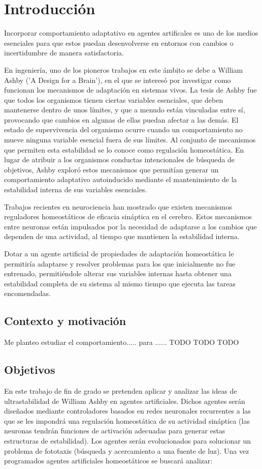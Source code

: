 \chapter{Introducción}
Incorporar comportamiento adaptativo en agentes artificales es uno de los medios esenciales para que estos puedan desenvolverse en entornos con cambios o incertidumbre de manera satisfactoria.

En ingeniería, uno de los pioneros trabajos en este ámbito se debe a William Ashby ('A Design for a Brain'), en el que se interesó por investigar como funcionan los mecanismos de
adaptación en sistemas vivos. La tesis de Ashby fue que todos los organismos tienen ciertas variables esenciales, que deben mantenerse dentro de unos límites, y que a menudo están
vinculadas entre sí, provocando que cambios en algunas de ellas puedan afectar a las demás. El estado de supervivencia del organismo ocurre cuando un comportamiento no mueve ninguna variable esencial
fuera de sus límites. Al conjunto de mecanismos que permiten esta estabilidad se lo conoce como regulación homeostática. En lugar de atribuir a los organismos conductas intencionales de búsqueda de objetivos,
Ashby exploró estos mecanismos que permitían generar un comportamiento adaptativo autoinducido mediante el mantenimiento de la estabilidad interna de sus variables esenciales.

Trabajos recientes en neurociencia han mostrado que existen mecanismos reguladores homeostáticos de eficacia sináptica en el cerebro. Estos mecanismos entre neuronas están impulsados por la
necesidad de adaptarse a los cambios que dependen de una actividad, al tiempo que mantienen la estabilidad interna.

Dotar a un agente artificial de propiedades de adaptación homeostática le permitiría adaptarse y resolver problemas para los que inicialmente no fue entrenado, permitiéndole alterar sus variables
internas hasta obtener una estabilidad completa de su sistema al mismo tiempo que ejecuta las tareas encomendadas.

\section{Contexto y motivación}
Me planteo estudiar el comportamiento..... para ...... TODO TODO TODO

\section{Objetivos}
En este trabajo de fin de grado se pretenden aplicar y analizar las ideas de
ultrastabilidad de William Ashby en agentes artificiales. Dichos agentes serán diseñados mediante controladores
basados en redes neuronales recurrentes a las que se les impondrá una regulación
homeostática de su actividad sináptica (las neuronas tendrán funciones de activación
adecuadas para generar estas estructuras de estabilidad). Los agentes serán evolucionados
para solucionar un problema de fototaxis (búsqueda y acercamiento a una fuente de luz).
Una vez programados agentes artificiales homeostáticos se buscará analizar:

